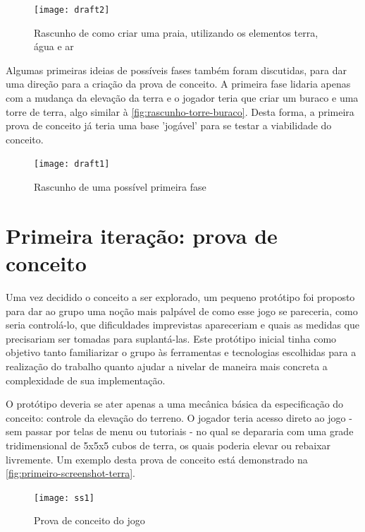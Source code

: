 \begin{figure}[htb]
	\centering
	\caption{Rascunho de como criar uma praia, utilizando os elementos terra, água e ar}
	\texttt{[image: draft2]}
	\legend{\fonteAP}
	\label{fig:rascunhos-praia}
\end{figure}

Algumas primeiras ideias de possíveis fases também foram discutidas, para 
dar uma direção para a criação da prova de conceito. A primeira fase lidaria 
apenas com a mudança da elevação da terra e o jogador teria que criar um 
buraco e uma torre de terra, algo similar à \autoref{fig:rascunho-torre-buraco}.
Desta forma, a primeira prova de conceito já teria uma base 'jogável' 
para se testar a viabilidade do conceito.

\begin{figure}[h]
	\centering
	\caption{Rascunho de uma possível primeira fase}
	\texttt{[image: draft1]}
	\legend{\fonteAP}
	\label{fig:rascunho-torre-buraco}
\end{figure}

\section{Primeira iteração: prova de conceito}\label{sec-primeira-iteracao-prova-conceito}

Uma vez decidido o conceito a ser explorado, um pequeno protótipo foi proposto 
para dar ao grupo uma noção mais palpável de como esse jogo se pareceria, como 
seria controlá-lo, que dificuldades imprevistas apareceriam e quais as medidas 
que precisariam ser tomadas para suplantá-las. Este protótipo inicial tinha 
como objetivo tanto familiarizar o grupo às ferramentas e tecnologias 
escolhidas para a realização do trabalho quanto ajudar a nivelar de maneira 
mais concreta a complexidade de sua implementação.

O protótipo deveria se ater apenas a uma mecânica básica da especificação 
do conceito: controle da elevação do terreno. O jogador teria acesso direto ao 
jogo - sem passar por telas de menu ou tutoriais - no qual se depararia com 
uma grade tridimensional de 5x5x5 cubos de terra, os quais poderia elevar 
ou rebaixar livremente. Um exemplo desta prova de conceito está 
demonstrado na \autoref{fig:primeiro-screenshot-terra}.

\begin{figure}[h]
	\centering
	\caption{Prova de conceito do jogo}
	\texttt{[image: ss1]}
	\legend{\fonteAP}
	\label{fig:primeiro-screenshot-terra}
\end{figure}

